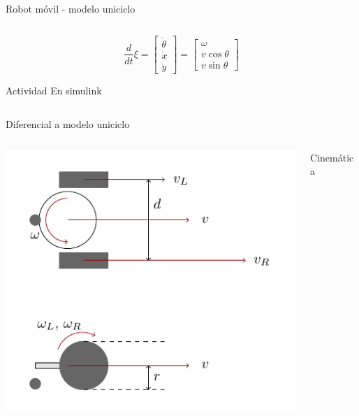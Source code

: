 \documentclass[presentation,aspectratio=169]{beamer}
\begin{document}
\begin{frame}[label={sec:orgd4c7659}]{Robot móvil - modelo uniciclo}
\begin{columns}
\begin{column}{0.6\columnwidth}
\[\frac{d}{dt} \xi = \begin{bmatrix} \dot{\theta}\\\dot{x}\\\dot{y} \end{bmatrix} = \begin{bmatrix} \omega\\ v\cos\theta\\v\sin\theta\end{bmatrix} \]


\pause

\alert{Actividad} En simulink
\end{column}
\end{columns}
\end{frame}



\begin{frame}[label={sec:org072d854}]{Diferencial a modelo uniciclo}
\begin{columns}
\begin{column}{0.4\columnwidth}
\begin{center}
 \includegraphics[width=1.0\linewidth]{../figures/unicycle-model-details}
\end{center}
\end{column}

\begin{column}{0.6\columnwidth}
\alert{Cinemática}

\pause


\end{column}
\end{columns}
\end{frame}
\end{document}
